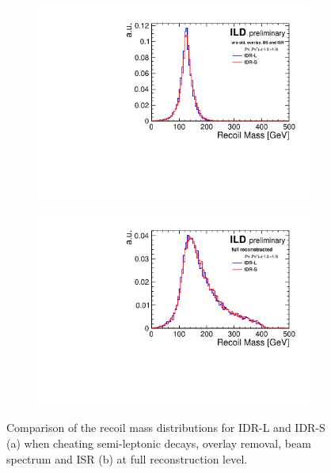 \begin{figure}[htbp]
\begin{subfigure}{0.49\hsize} 
 \includegraphics[width=\textwidth]{Performance/fig/compare_detector_cmrec_lr.pdf}
 \caption{ \label{fig:Hinv:comp:cheatmrec}}
 \end{subfigure}
\begin{subfigure}{0.49\hsize} 
 \includegraphics[width=\textwidth]{Performance/fig/compare_detector_mrec_lr.pdf}
 \caption{  \label{fig:Hinv:comp:mrec}}
 \end{subfigure}
\caption{Comparison of the recoil mass distributions for IDR-L and IDR-S
(a) when cheating semi-leptonic decays, overlay removal, beam spectrum and ISR
(b) at full reconstruction level.
}
\label{fig:Hinv:comp}
\end{figure}


